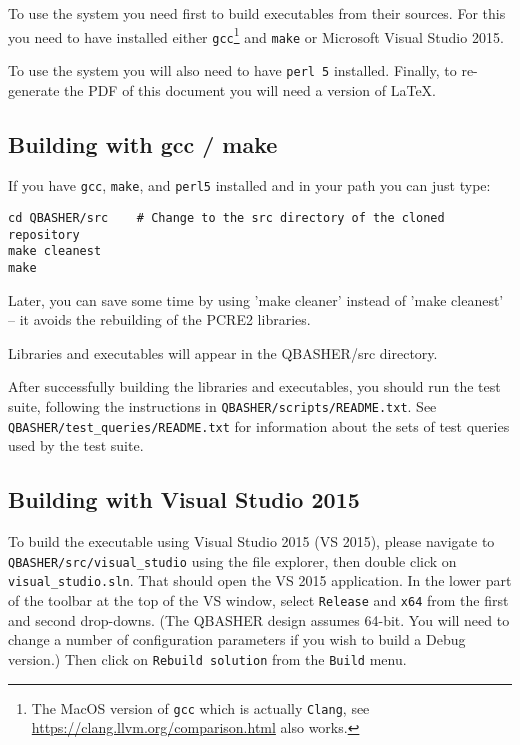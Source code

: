 \documentclass{article}
\begin{document}
To use the system you need first to build executables from their sources.
For this you need to have installed either \texttt{gcc}\footnote{The
  MacOS version of \texttt{gcc} which is actually \texttt{Clang}, see
  \url{https://clang.llvm.org/comparison.html} also works.}  and
\texttt{make} or Microsoft Visual Studio 2015.  

To use the system you will also need to have \texttt{perl 5}
installed.  Finally, to re-generate the PDF of this document you will
need a version of LaTeX.

\subsection{Building with gcc / make}

If you have \texttt{gcc}, \texttt{make}, and \texttt{perl5} installed
and in your path you can just type:

\begin{verbatim}
cd QBASHER/src    # Change to the src directory of the cloned repository
make cleanest
make
\end{verbatim}

Later, you can save some time by using 'make cleaner' instead of 'make
cleanest' -- it avoids the rebuilding of the PCRE2 libraries.

Libraries and executables will appear in the QBASHER/src directory.

After successfully building the libraries and executables, you should
run the test suite, following the instructions in
\texttt{QBASHER/scripts/README.txt}. See
\texttt{QBASHER/test\_queries/README.txt} for information about the
sets of test queries used by the test suite.


\subsection{Building with Visual Studio 2015}

To build the executable using Visual Studio 2015 (VS 2015), please navigate to
\texttt{QBASHER/src/visual\_studio} using the file explorer, then
double click on \texttt{visual\_studio.sln}. That should open the VS
2015 application.  In the lower part of the toolbar at the top
of the VS window, select \texttt{Release} and \texttt{x64} from the
first and second drop-downs.  (The QBASHER design assumes 64-bit.
You will need to change a number of configuration parameters if you
wish to build a Debug version.)
Then click on \texttt{Rebuild solution}
from the \texttt{Build} menu.  
\end{document}
